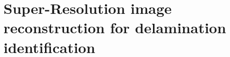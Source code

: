 \section{Super-Resolution image reconstruction for delamination identification}
\label{sec45}
%
%
%
%
